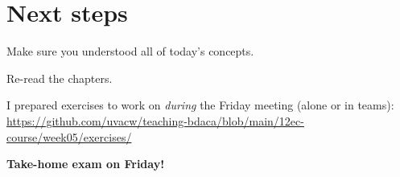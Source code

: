 
\section{Next steps}

\begin{frame}[standout]
Make sure you understood all of today's concepts.

Re-read the chapters.

I prepared exercises to work on \emph{during} the Friday meeting (alone or in teams):
\large{\url{https://github.com/uvacw/teaching-bdaca/blob/main/12ec-course/week05/exercises/}}


\textbf{Take-home exam on Friday!}

\end{frame}





\begin{frame}
	\printbibliography
\end{frame}




